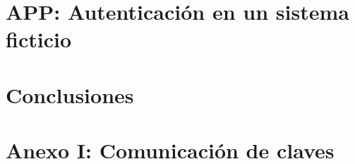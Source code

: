 \documentclass[a4paper,12pt, twoside, openright,makeidx]{book}
\newcommand\blankpage{%
    \null
    \thispagestyle{empty}%
    \addtocounter{page}{-1}%
    \newpage}
\begin{document}
\chapter{APP: Autenticación en un sistema ficticio}
\label{APP: Autenticación en sistema ficticio}

%
\chapter{Conclusiones}
\label{Conclusiones}


\afterpage{\blankpage}	%
\chapter*{Anexo I: Comunicación de claves}
\label{AnexoI}




\nocite{*}
\afterpage{\blankpage}	%

\end{document}

